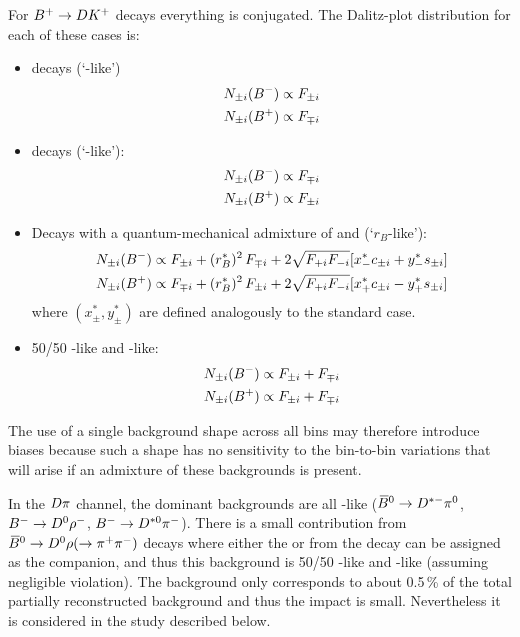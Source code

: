 For ${{{B}^+}}\rightarrow DK^+$ decays everything is \CP conjugated. The Dalitz-plot distribution for each of these cases is:
\begin{itemize}
\item \Dz decays (`\Dz-like')
\begin{align}
\begin{split}
N_{\pm i}({{{B}^-}}) & \propto F_{\pm i} \label{eq:nD0} \\
N_{\pm i}({{{B}^+}}) & \propto F_{\mp i}
\end{split}
\end{align}
\item \Dzb decays (`\Dzb-like'):
\begin{align}{}
\begin{split}
N_{\pm i}({{{B}^-}}) & \propto F_{\mp i} \\
N_{\pm i}({{{B}^+}}) & \propto F_{\pm i}
\end{split}
\end{align}
\item Decays with a quantum-mechanical admixture of \Dz and \Dzb (`$r_B$-like'):
\begin{align}
\begin{split}
N_{\pm i}({{{B}^-}}) & \propto F_{\pm i} + (r_{B}^{*})^2\,F_{\mp i} + 2\sqrt{F_{+i}F_{-i}}[x_{-}^{*}c_{\pm i} + y_{-}^{*}s_{\pm i}] \\
N_{\pm i}({{{B}^+}}) & \propto F_{\mp i} + (r_{B}^{*})^2\,F_{\pm i} + 2\sqrt{F_{+i}F_{-i}}[x_{+}^{*}c_{\pm i} - y_{+}^{*}s_{\pm i}] \label{eq:nrB} 
\end{split}
\end{align}
where $(x_{\pm}^{*},y_{\pm}^{*})$ are defined analogously to the standard \BtoDK case.

\item 50/50 \Dz-like and \Dzb-like:
\begin{align}
\begin{split}
N_{\pm i}({{{B}^-}}) & \propto F_{\pm i} + F_{\mp i}  \\
N_{\pm i}({{{B}^+}}) & \propto F_{\pm i} + F_{\mp i}  \label{eq:n5050} 
\end{split}
\end{align}
\end{itemize}
The use of a single background shape across all bins may therefore introduce biases because such a shape has no sensitivity to the bin-to-bin variations that will arise if an  admixture of these backgrounds is present. 

In the ${D}\pi$ channel, the dominant backgrounds are all \Dz-like (${{\kern 0.18em\overline{\kern -0.18em B}}{}^0}\rightarrow{\ensuremath{{D}^{*-}}}{\ensuremath{{\pi}^0}}$, ${{{B}^-}}\rightarrow{\ensuremath{{D}^0}}\rho^-$, ${{{B}^-}}\rightarrow{\ensuremath{{D}^{*0}}}{\ensuremath{{\pi}^-}}$). There is a small contribution from ${{{\kern 0.18em\overline{\kern -0.18em B}}{}^0}\rightarrow{\ensuremath{{D}^0}}\rho(\rightarrow{\ensuremath{{\pi}^+}}{\ensuremath{{\pi}^-}})}$ decays where either the \pip or \pim from the \rhoz decay can be assigned as the companion, and thus this background is 50/50 \Dz-like and \Dzb-like (assuming negligible \CP violation). The background only corresponds to about 0.5\,\% of the total partially reconstructed background and thus the impact is small. Nevertheless it is considered in the study described below.

